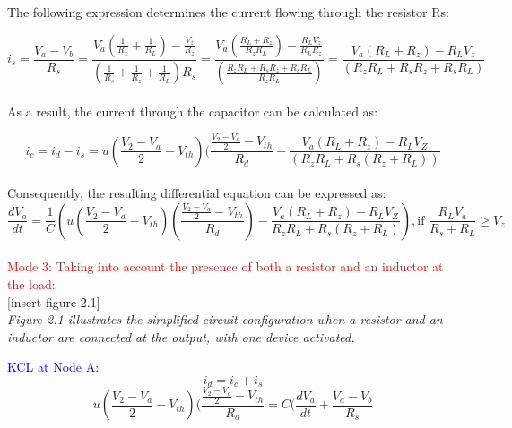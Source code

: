 The following expression determines the current flowing through the resistor Rs:

\begin{equation}
    i_s=\frac{V_a-V_b}{R_s}=\frac{V_a(\frac{1}{R_z}+\frac{1}{R_L})-\frac{V_z}{R_z}}{(\frac{1}{R_s}+\frac{1}{R_z}+\frac{1}{R_L})R_s}=\frac{V_a(\frac{R_L+R_z}{R_zR_L})-\frac{R_LV_z}{R_LR_z}}{(\frac{R_zR_L+R_sR_z+R_sR_L}{R_zR_L})}=\frac{V_a(R_L+R_z)-R_LV_z}{(R_zR_L+R_sR_z+R_sR_L)}
\end{equation}\\

As a result, the current through the capacitor can be calculated as:

\begin{equation}
    i_c=i_d-i_s=u(\frac{V_2-V_a}{2}-V_{th})(\frac{\frac{V_2-V_a}{2}-V_{th}}{R_d}-\frac{V_a(R_L+R_z)-R_LV_Z}{(R_zR_L+R_s(R_z+R_L))}
\end{equation}\\

Consequently, the resulting differential equation can be expressed as:\\

\begin{equation}
    \frac{dV_a}{dt}=\frac{1}{C}\left(u\left(\frac{V_2-V_a}{2}-V_{th}\right)\left(\frac{\frac{V_2-V_a}{2}-V_{th}}{R_d}\right)-\frac{V_a(R_L+R_z)-R_LV_Z}{R_zR_L+R_s(R_z+R_L)}\right), \text{if } \frac{R_LV_a}{R_s+R_L} \geq V_z
\end{equation}\\

\large\textcolor{red}{Mode 3: Taking into account the presence of both a resistor and an inductor at the load:}\\

[insert figure 2.1]\\

\emph{Figure 2.1 illustrates the simplified circuit configuration when a resistor and an inductor are connected at the output, with one device activated.}

\textcolor{blue}{KCL at Node A:}\\
\begin{equation}
    i_d=i_c+i_s
\end{equation}
\begin{equation}
    u(\frac{V_2-V_a}{2}-V_{th})(\frac{\frac{V_2-V_a}{2}-V_{th}}{R_d}=C(\frac{dV_a}{dt}+\frac{V_a-V_b}{R_s}
\end{equation}\\

